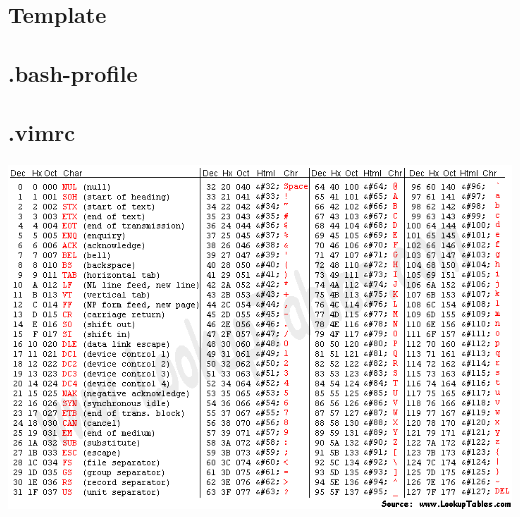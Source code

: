 \documentclass[a4paper]{article}
\begin{document}
\begin{multicols*}{2}
    \subsection{Template}
        
    \subsection{.bash-profile}
        
    \subsection{.vimrc}
        
    \includegraphics[width=\linewidth]{../other/asciifull.png}

\end{multicols*}
\end{document}
